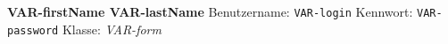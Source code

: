 \bigskip\textbf{\large VAR-firstName VAR-lastName}\medskip
Benutzername: \texttt{VAR-login}
Kennwort: \texttt{VAR-password}\smallskip
Klasse: \textsl{VAR-form}
~

